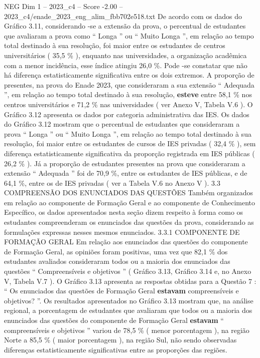 \begin{textsample}{NEG Dim 1 – 2023\_c4 – Score -2.00 – 2023\_c4/enade\_2023\_eng\_alim\_fbb702e518.txt}
De acordo com os dados do Gráfico 3.11, considerando -se a extensão da prova, o percentual de estudantes que avaliaram a prova como “ Longa ” ou “ Muito Longa ”, em relação ao tempo total destinado à sua resolução, foi maior entre os estudantes de centros universitários ( 35,5 \% ), enquanto nas universidades, a organização acadêmica com a menor incidência, esse índice atingiu 26,0 \%.
Pode -se constatar que não há diferença estatisticamente significativa entre os dois extremos.
A proporção de presentes, na prova do Enade 2023, que consideraram a sua extensão “ Adequada ”, em relação ao tempo total destinado à sua resolução, \textbf{esteve} entre 58,1 \% nos centros universitários e 71,2 \% nas universidades ( ver Anexo V, Tabela V.6 ).
O Gráfico 3.12 apresenta os dados por categoria administrativa das IES.
Os dados do Gráfico 3.12 mostram que o percentual de estudantes que consideraram a prova “ Longa ” ou “ Muito Longa ”, em relação ao tempo total destinado à sua resolução, foi maior entre os estudantes de cursos de IES privadas ( 32,4 \% ), sem diferença estatisticamente significativa da proporção registrada em IES públicas ( 26,2 \% ).
Já a proporção de estudantes presentes na prova que consideraram a extensão “ Adequada ” foi de 70,9 \%, entre os estudantes de IES públicas, e de 64,1 \%, entre os de IES privadas ( ver a Tabela V.6 no Anexo V ). 3.3 COMPREENSÃO DOS ENUNCIADOS DAS QUESTÕES Também organizados em relação ao componente de Formação Geral e ao componente de Conhecimento Específico, os dados apresentados nesta seção dizem respeito à forma como os estudantes compreenderam os enunciados das questões da prova, considerando as formulações expressas nesses mesmos enunciados. 3.3.1 COMPONENTE DE FORMAÇÃO GERAL Em relação aos enunciados das questões do componente de Formação Geral, as opiniões foram positivas, uma vez que 82,1 \% dos estudantes avaliados consideraram todos ou a maioria dos enunciados das questões “ Compreensíveis e objetivos ” ( Gráfico 3.13, Gráfico 3.14 e, no Anexo V, Tabela V.7 ).
O Gráfico 3.13 apresenta as respostas obtidas para a Questão 7 : “ Os enunciados das questões de Formação Geral \textbf{estavam} compreensíveis e objetivos? ”.
Os resultados apresentados no Gráfico 3.13 mostram que, na análise regional, a porcentagem de estudantes que avaliaram que todos ou a maioria dos enunciados das questões do componente de Formação Geral \textbf{estavam} “ compreensíveis e objetivos ” variou de 78,5 \% ( menor porcentagem ), na região Norte a 85,5 \% ( maior porcentagem ), na região Sul, não sendo observadas diferenças estatisticamente significativas entre as proporções das regiões.

\end{textsample}
